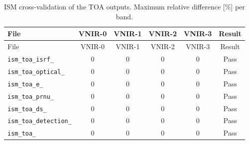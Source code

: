 \begin{longtable}{lccccc}
\caption{ISM cross-validation of the TOA outputs. Maximum relative difference [\%] per band.}\label{tab:ism_crossval_toa}\\
\toprule
File & VNIR-0 & VNIR-1 & VNIR-2 & VNIR-3 & Result \\
\midrule
\endfirsthead
\toprule
File & VNIR-0 & VNIR-1 & VNIR-2 & VNIR-3 & Result \\
\midrule
\endhead
\texttt{ism\_toa\_isrf\_} & $0$ & $0$ & $0$ & $0$ & Pass \\
\texttt{ism\_toa\_optical\_} & $0$ & $0$ & $0$ & $0$ & Pass \\
\texttt{ism\_toa\_e\_} & $0$ & $0$ & $0$ & $0$ & Pass \\
\texttt{ism\_toa\_prnu\_} & $0$ & $0$ & $0$ & $0$ & Pass \\
\texttt{ism\_toa\_ds\_} & $0$ & $0$ & $0$ & $0$ & Pass \\
\texttt{ism\_toa\_detection\_} & $0$ & $0$ & $0$ & $0$ & Pass \\
\texttt{ism\_toa\_} & $0$ & $0$ & $0$ & $0$ & Pass \\
\bottomrule
\end{longtable}
